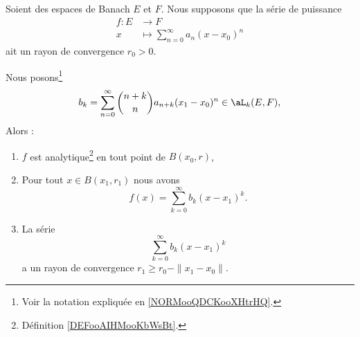 \begin{theorem}	\label{THOooHSXLooMCzTTD}
	Soient des espaces de Banach \( E\) et \( F\). Nous supposons que la série de puissance
	\begin{equation}
		\begin{aligned}
			f\colon E & \to F                                   \\
			x         & \mapsto \sum_{n=0}^{\infty}a_n(x-x_0)^n
		\end{aligned}
	\end{equation}
	ait un rayon de convergence \( r_0>0\).

	Nous posons\footnote{Voir la notation expliquée en \ref{NORMooQDCKooXHtrHQ}.}
	\begin{equation}		\label{EQooXVAIooOXGaQz}
		b_k=\sum_{n=0}^{\infty}\binom{n+k}{n}a_{n+k}(x_1-x_0)^n\in\aL_k(E,F),
	\end{equation}
	Alors :
	\begin{enumerate}
		\item		\label{ITEMooWBTAooGrKzpo}
		      \( f\) est analytique\footnote{Définition \ref{DEFooAIHMooKbWsBt}.} en tout point de \( B(x_0,r)\),
		\item		\label{ITEMooOPLBooTZZOOx}
		      Pour tout \( x\in B(x_1,r_1)\) nous avons
		      \begin{equation}
			      f(x)=\sum_{k=0}^{\infty}b_k(x-x_1)^k.
		      \end{equation}
		\item		\label{ITEMooNTPIooXpKePf}
		      La série
		      \begin{equation}
			      \sum_{k=0}^{\infty}b_k(x-x_1)^k
		      \end{equation}
		      a un rayon de convergence \( r_1\geq r_0-\| x_1-x_0 \|\).
	\end{enumerate}
\end{theorem}

